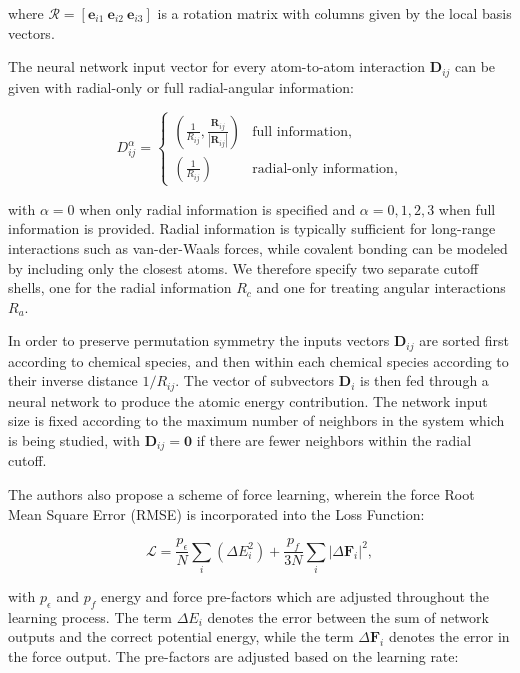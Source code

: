 where $\mathcal{R} = [\bm{e}_{i1} \ \bm{e}_{i2} \ \bm{e}_{i3}]$
is a rotation matrix with columns given by the local basis vectors.
\par
The neural network input vector for every atom-to-atom interaction
$\bm{D}_{ij}$ can be given with radial-only or full radial-angular
information:

\begin{equation}
    D_{ij}^{\alpha} =
\begin{cases}
    \displaystyle\left( \frac{1}{R_{ij}}, \frac{\bm{R}_{ij}}{\left| \bm{R}_{ij} \right|}
    \right) & \text{full information}, \\[10pt]
    \displaystyle\left( \frac{1}{R_{ij}} \right) & \text{radial-only information},
\end{cases}
\end{equation}

with $\alpha = 0$ when only radial information is specified
and $\alpha = 0,1,2,3$ when full information is provided. Radial information
is typically sufficient for long-range interactions such as van-der-Waals
forces, while covalent bonding can be modeled by including
only the closest atoms. We therefore specify two separate
cutoff shells, one for the radial information $R_c$ and one
for treating angular interactions $R_a$.
\par
In order to preserve permutation symmetry the inputs vectors $\bm{D}_{ij}$
are sorted first according to chemical species, and then within
each chemical species according to their inverse distance $1 / R_{ij}$.
The vector of subvectors $\bm{D}_i$ is then fed through a neural
network to produce the atomic energy contribution.
The network input size is fixed according to the maximum number of neighbors
in the system which is being studied, with $\bm{D}_{ij} = \bm{0}$
if there are fewer neighbors within the radial cutoff.
\par
The authors also propose a scheme of force learning, wherein
the force Root Mean Square Error (RMSE) is incorporated into the Loss Function:

\begin{equation}
    \mathcal{L} = \frac{p_{\epsilon}}{N} \sum_i
    \left( \Delta E_i^2 \right)
    + \frac{p_{f}}{3N} \sum_i \left| \Delta \bm{F}_i \right|^2,
\end{equation}

with $p_{\epsilon}$ and $p_{f}$ energy and force pre-factors which are
adjusted throughout the learning process. The term $\Delta E_i$
denotes the error between the sum of network outputs
and the correct potential energy, while the term $\Delta \bm{F}_i$
denotes the error in the force output.
The pre-factors are adjusted based on the learning rate:

